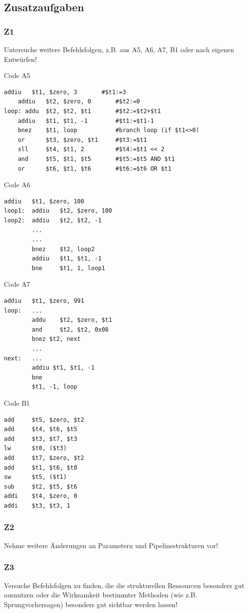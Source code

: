 \documentclass[a4paper,12pt,titlepage]{scrartcl}
\begin{document}
\subsection*{Zusatzaufgaben}
\subsubsection*{Z1}
Untersuche weitere Befehlsfolgen, z.B. aus A5, A6, A7, B1 oder nach eigenen Entwürfen!

Code A5
\begin{lstlisting}[basicstyle=\tiny]
    addiu   $t1, $zero, 3       #$t1:=3
    addiu   $t2, $zero, 0       #$t2:=0
loop: addu  $t2, $t2, $t1       #$t2:=$t2+$t1
    addiu   $t1, $t1, -1        #$t1:=$t1-1
    bnez    $t1, loop           #branch loop (if $t1<>0)
    or      $t3, $zero, $t1     #$t3:=$t1
    sll     $t4, $t1, 2         #$t4:=$t1 << 2
    and     $t5, $t1, $t5       #$t5:=$t5 AND $t1
    or      $t6, $t1, $t6       #$t6:=$t6 OR $t1
\end{lstlisting}

Code A6
\begin{lstlisting}[basicstyle=\tiny]
        addiu   $t1, $zero, 100
loop1:  addiu   $t2, $zero, 100
loop2:  addiu   $t2, $t2, -1
        ...
        ...
        bnez    $t2, loop2
        addiu   $t1, $t1, -1
        bne     $t1, 1, loop1
\end{lstlisting}

Code A7
\begin{lstlisting}[basicstyle=\tiny]
        addiu   $t1, $zero, 991
loop:   ...
        addu    $t2, $zero, $t1
        and     $t2, $t2, 0x08
        bnez $t2, next
        ...
next:   ...
        addiu $t1, $t1, -1
        bne
        $t1, -1, loop
\end{lstlisting}

Code B1
\begin{lstlisting}[basicstyle=\tiny]
add     $t5, $zero, $t2
add     $t4, $t6, $t5
add     $t3, $t7, $t3
lw      $t0, ($t3)
add     $t7, $zero, $t2
add     $t1, $t6, $t0
sw      $t5, ($t1)
sub     $t2, $t5, $t6
addi    $t4, $zero, 0
addi    $t3, $t3, 1
\end{lstlisting}

\subsubsection*{Z2}
Nehme weitere Änderungen an Parametern und Pipelinestrukturen vor!

\subsubsection*{Z3}
Versuche Befehlsfolgen zu finden, die die strukturellen Ressourcen besonders gut ausnutzen oder die Wirksamkeit bestimmter Methoden (wie z.B. Sprungvorhersagen) besonders gut sichtbar werden lassen!
\end{document}
